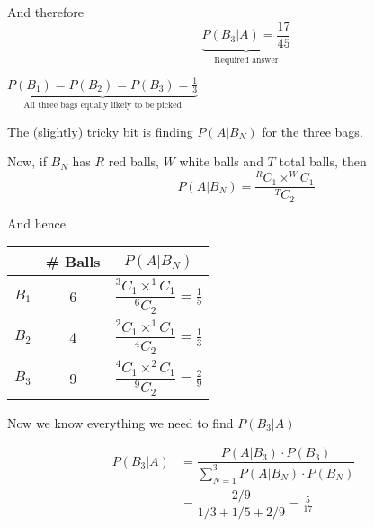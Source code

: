 \documentclass[14pt,fleqn]{extarticle}
\begin{document}
And therefore 
\[ \qquad \underbrace{P \left(B_3\vert A \right) = \frac{17}{45}}_{\text{Required answer}}\]
\newcard 

$\underbrace{P \left(B_1 \right) = P \left(B_2 \right) = P \left(B_3 \right) = \frac{1}{3}}_{\text{All three bags equally likely to be picked}}$\newline\newline

The (slightly) tricky bit is finding $P \left(A\vert B_N \right)$ for the three bags.

Now, if $B_N$ has $R$ red balls, $W$ white balls and $T$ total balls, then 
\[ \qquad P \left(A\vert B_N \right) = \dfrac{^RC_1\times ^WC_1}{^TC_2} \] 

And hence\newline 

\begin{tabular}{|c|c|c|}
\hline
	& \# Balls & $P \left(A\vert B_N \right)$ \\
\hline
	$B_1$ & 6 & $\dfrac{^3C_1\times ^1C_1}{^6C_2} = \frac{1}{5}$ \\
\hline 
	$B_2$ & 4 & $\dfrac{^2C_1\times ^1C_1}{^4C_2} = \frac{1}{3}$ \\
\hline
	$B_3$ & 9 & $\dfrac{^4C_1\times ^2C_1}{^9C_2} = \frac{2}{9}$ \\
\hline 
\end{tabular}\newline 

Now we know everything we need to find $P \left(B_3\vert A \right)$

\begin{align}
P \left(B_3\vert A \right) &= \dfrac{P \left(A\vert B_3 \right)\cdot P(B_3)}{\sum_{N=1}^3 P \left(A\vert B_N \right)\cdot P \left(B_N \right)} \\
&= \dfrac{2/9}{1/3 + 1/5+2/9} = \frac{5}{17} 
\end{align}
\end{document}
